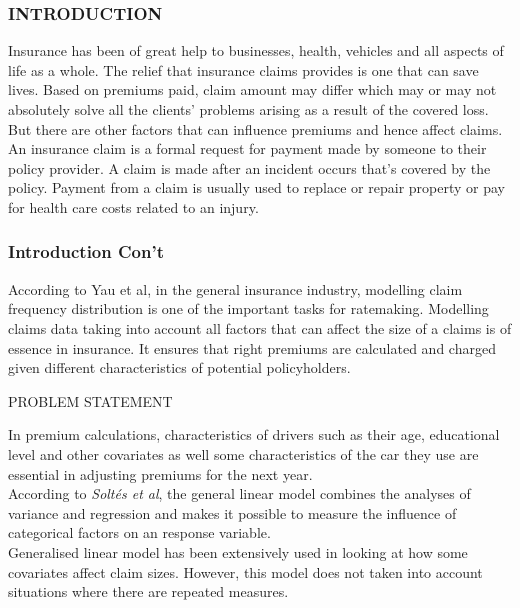 \documentclass[11pt]{beamer}
\begin{document}
	\begin{frame}
		\frametitle{INTRODUCTION}
		\begin{block}{}
		Insurance has been of great help to businesses, health, vehicles and all aspects of life as a whole. The relief that insurance claims provides is one that can save lives. Based on premiums paid, claim amount may differ which may or may not absolutely solve all the clients’ problems arising as a result of the covered loss. But there are other factors that can influence premiums and hence affect claims.
		An insurance claim is a formal request for payment made by someone to their policy provider. A claim is made after an incident occurs that's covered by the policy. Payment from a claim is usually used to replace or repair property or pay for health care costs related to an injury. \\
       \end{block}
	\end{frame}
     \begin{frame}
     	\frametitle{Introduction Con't}
     	\begin{block}{}
     		According to Yau et al, in the general insurance industry, modelling claim frequency distribution is one of the important tasks for ratemaking.	Modelling claims data taking into account all factors that can affect the size of a claims is of essence in insurance. It ensures that right premiums are calculated and charged given different characteristics of potential policyholders. 
     	\end{block}
     
     \end{frame}
\begin{frame}
	
	\begin{block}{PROBLEM STATEMENT}
		
		In premium calculations, characteristics of drivers such as their age, educational level and other covariates as well some characteristics of the car they use are essential in adjusting premiums for the next year.\\
		\vspace{20pt} 
		According to \emph{Soltés et al}, the general linear model combines the analyses of variance and regression and makes it possible to measure the influence of categorical factors on an response variable.\\
		\vspace{20pt} 
		Generalised linear model has been extensively used in looking at how some covariates affect claim sizes. However, this model does not taken into account situations where there are repeated measures. 
		
	
	\end{block}
\end{frame}
\end{document}
